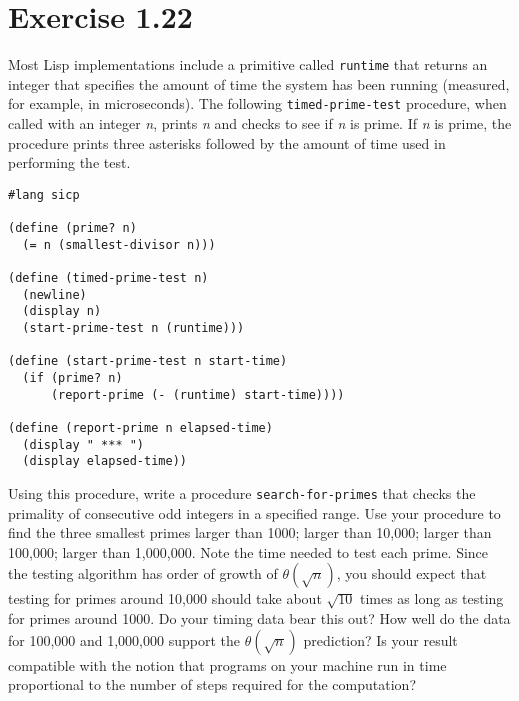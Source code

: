\documentclass[11pt]{article}
\begin{document}
\section{Exercise 1.22}
\label{sec:org1720b7b}
Most Lisp implementations include a primitive called \texttt{runtime} that returns an
integer that specifies the amount of time the system has been running
(measured, for example, in microseconds). The following \texttt{timed-prime-test}
procedure, when called with an integer \emph{n}, prints \emph{n} and checks to see if
\emph{n} is prime. If \emph{n} is prime, the procedure prints three asterisks followed
by the amount of time used in performing the test.
\begin{verbatim}
#lang sicp

(define (prime? n)
  (= n (smallest-divisor n)))

(define (timed-prime-test n)
  (newline)
  (display n)
  (start-prime-test n (runtime)))

(define (start-prime-test n start-time)
  (if (prime? n)
      (report-prime (- (runtime) start-time))))

(define (report-prime n elapsed-time)
  (display " *** ")
  (display elapsed-time))
\end{verbatim}
Using this procedure, write a procedure \texttt{search-for-primes} that checks the
primality of consecutive odd integers in a specified range. Use your procedure
to find the three smallest primes larger than 1000; larger than 10,000; larger
than 100,000; larger than 1,000,000. Note the time needed to test each
prime. Since the testing algorithm has order of growth of \(\theta(\sqrt{n})\), you should expect that testing for primes around 10,000 should take about
\(\sqrt{10}\) times as long as testing for primes around 1000. Do your
timing data bear this out? How well do the data for 100,000 and 1,000,000
support the \(\theta(\sqrt{n})\) prediction? Is your result compatible with
the notion that programs on your machine run in time proportional to the
number of steps required for the computation?
\end{document}
